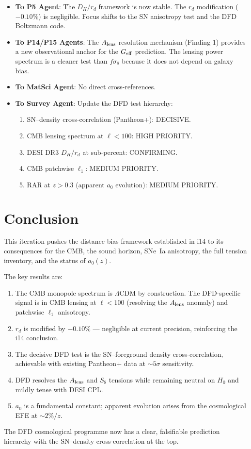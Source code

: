 \documentclass[11pt,a4paper]{article}
\newcommand{\LCDM}{$\Lambda$CDM}
\newcommand{\Geff}{G_{\rm eff}}
\begin{document}
\begin{itemize}
\item \textbf{To P5 Agent}: The $D_H/r_d$ framework is now stable.
  The $r_d$ modification ($-0.10\%$) is negligible.  Focus shifts to
  the SN anisotropy test and the DFD Boltzmann code.

\item \textbf{To P14/P15 Agents}: The $A_{\rm lens}$ resolution
  mechanism (Finding 1) provides a new observational anchor for the
  $\Geff$ prediction.  The lensing power spectrum is a cleaner test
  than $f\sigma_8$ because it does not depend on galaxy bias.

\item \textbf{To MatSci Agent}: No direct cross-references.

\item \textbf{To Survey Agent}: Update the DFD test hierarchy:
  \begin{enumerate}[nosep]
  \item SN--density cross-correlation (Pantheon+): DECISIVE.
  \item CMB lensing spectrum at $\ell < 100$: HIGH PRIORITY.
  \item DESI DR3 $D_H/r_d$ at sub-percent: CONFIRMING.
  \item CMB patchwise $\ell_1$: MEDIUM PRIORITY.
  \item RAR at $z > 0.3$ (apparent $a_0$ evolution): MEDIUM PRIORITY.
  \end{enumerate}
\end{itemize}


\section{Conclusion}
\label{sec:conclusion}

This iteration pushes the distance-bias framework established in i14
to its consequences for the CMB, the sound horizon, SNe~Ia anisotropy,
the full tension inventory, and the status of $a_0(z)$.

The key results are:
\begin{enumerate}[nosep]
\item The CMB monopole spectrum is \LCDM{} by construction.  The
  DFD-specific signal is in CMB lensing at $\ell < 100$ (resolving
  the $A_{\rm lens}$ anomaly) and patchwise $\ell_1$ anisotropy.
\item $r_d$ is modified by $-0.10\%$ --- negligible at current
  precision, reinforcing the i14 conclusion.
\item The decisive DFD test is the SN--foreground density
  cross-correlation, achievable with existing Pantheon+ data at
  $\sim 5\sigma$ sensitivity.
\item DFD resolves the $A_{\rm lens}$ and $S_8$ tensions while
  remaining neutral on $H_0$ and mildly tense with DESI CPL.
\item $a_0$ is a fundamental constant; apparent evolution arises
  from the cosmological EFE at $\sim 2\%/z$.
\end{enumerate}

The DFD cosmological programme now has a clear, falsifiable
prediction hierarchy with the SN--density cross-correlation at the top.
\end{document}
